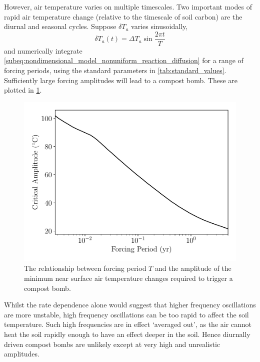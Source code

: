 However, air temperature varies on multiple timescales. Two important modes of rapid air temperature change (relative to the timescale of soil
carbon) are the diurnal and seasonal cycles. Suppose $\delta T_a$ varies sinusoidally,
\begin{equation}
  \label{eq:sinusoidal_forcing}
  \delta T_a(t) = \Delta T_a \sin \frac{2\pi t}{T}
\end{equation}
and numerically integrate \cref{subeq:nondimensional_model_nonuniform_reaction_diffusion} for a range of
forcing periods, using the standard parameters in \cref{tab:standard_values}. Sufficiently large forcing amplitudes will lead to a compost bomb.
These are plotted in \cref{fig:forcing_frequency_vs_amplitude}.
\begin{figure}
  \centering
  \includegraphics[width=\textwidth,keepaspectratio]{critical_amplitude_vs_period}
  \caption[Critical warming for periodic forcing]{The relationship between forcing period $T$ and the amplitude of the minimum near surface air temperature changes required to trigger a compost bomb.}
  \label{fig:forcing_frequency_vs_amplitude}
\end{figure}

Whilst the rate dependence alone would suggest that higher frequency oscillations are more unstable,
high frequency oscillations can be too rapid to affect the soil temperature. Such high frequencies are in effect `averaged out', as the air cannot heat the soil rapidly enough to
have an effect deeper in the soil. Hence diurnally driven compost bombs are unlikely except at very high and unrealistic amplitudes.

